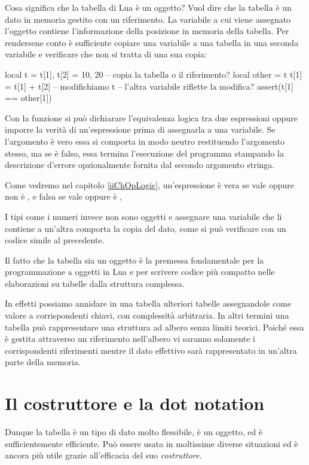 Cosa significa che la tabella di Lua è un oggetto? Vuol dire che la tabella è un
dato in memoria gestito con un riferimento. La variabile a cui viene assegnato
l'oggetto contiene l'informazione della posizione in memoria della tabella. Per
rendersene conto è sufficiente copiare una variabile a una tabella in una
seconda variabile e verificare che non si tratta di una sua copia:
\begin{lines}
local t = {}
t[1], t[2] = 10, 20
-- copia la tabella o il riferimento?
local other = t
t[1] = t[1] + t[2] -- modifichiamo t
-- l'altra variabile riflette la modifica?
assert(t[1] == other[1])
\end{lines}

Con la funzione  si può dichiarare l'equivalenza
logica tra due espressioni oppure imporre la verità di un'espressione prima di
assegnarla a una variabile. Se l'argomento è vero essa si comporta in modo
neutro restituendo l'argomento stesso, ma se è falso, essa termina l'esecuzione
del programma stampando la descrizione d'errore opzionalmente fornita dal
secondo argomento stringa.

Come vedremo nel capitolo \ref{iiChOpLogic}, un'espressione è vera se vale
 oppure non è , e falsa se vale  oppure è
,

I tipi come i numeri invece non sono oggetti e assegnare una variabile che li
contiene a un'altra comporta la copia del dato, come si può verificare con un
codice simile al precedente.

Il fatto che la tabella sia un oggetto è la premessa fondamentale per la
programmazione a oggetti in Lua e per scrivere codice più compatto nelle
elaborazioni su tabelle dalla struttura complessa.

In effetti possiamo annidare in una tabella ulteriori tabelle assegnandole come
valore a corrispondenti chiavi, con complessità arbitraria. In altri termini una
tabella può rappresentare una struttura ad albero senza limiti teorici. Poiché
essa è gestita attraverso un riferimento nell'albero vi saranno solamente i
corrispondenti riferimenti mentre il dato effettivo sarà rappresentato in
un'altra parte della memoria.


\section{Il costruttore e la dot notation}

Dunque la tabella è un tipo di dato molto flessibile, è un oggetto, ed è
sufficientemente efficiente. Può essere usata in moltissime diverse situazioni
ed è ancora più utile grazie all'efficacia del suo \emph{costruttore}.

